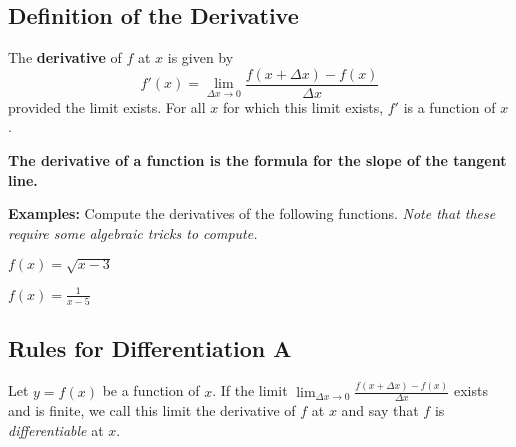 \documentclass[addpoints, 12pt]{exam}
\begin{document}
\subsection*{Definition of the Derivative}
\begin{tcolorbox}[title= DEFINITION OF THE DERIVATIVE OF A FUNCTION,colframe=black,sharp corners,colback=white,colbacktitle=white,coltitle=black,boxrule=1pt]

    The \textbf{derivative} of $f$ at $x$ is given by
    \[f'(x)=\lim_{\Delta x\to0}\frac{f(x+\Delta x)-f(x)}{\Delta x}\]
    provided the limit exists. For all $x$ for which this limit exists, $f'$ is a function of $x$.
    
\end{tcolorbox}
\vspace{.15cm}
\begin{center}
    \textbf{The derivative of a function is the formula for the slope of the tangent line.}
\end{center}
\noindent\textbf{Examples:} Compute the derivatives of the following functions. \textit{Note that these require some algebraic tricks to compute.}
\begin{questions}
    \question $\displaystyle f(x)=\sqrt{x-3}$
    
    \question $\displaystyle f(x)=\frac{1}{x-5}$
\end{questions}



\newpage
{}
\subsection*{Rules for Differentiation A}

Let $y=f(x)$ be a function of $x$. If the limit $\displaystyle\lim_{\Delta x\to0}\frac{f(x+\Delta x)-f(x)}{\Delta x}$ exists and is finite, we call this limit the derivative of $f$ at $x$ and say that $f$ is \textit{differentiable} at $x$.
\end{document}
